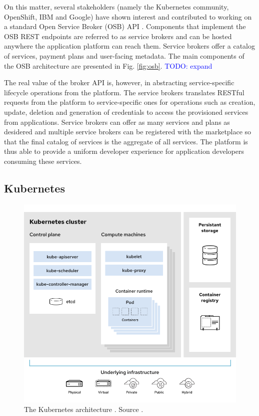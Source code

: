 On this matter, several stakeholders (namely the Kubernetes community, OpenShift, IBM and Google) have shown interest and contributed to working on a standard Open Service Broker (OSB) API \cite{osb}. Components that implement the OSB REST endpoints are referred to as service brokers and can be hosted anywhere the application platform can reach them. Service brokers offer a catalog of services, payment plans and user-facing metadata. The main components of the OSB architecture are presented in Fig. \ref{fig:osb}. \textcolor{blue}{TODO: expand}

The real value of the broker API is, however, in abstracting service-specific lifecycle operations from the platform. The service brokers translates RESTful requests from the platform to service-specific ones for operations such as creation, update, deletion and generation of credentials to access the provisioned services from applications. Service brokers can offer as many services and plans as desidered and multiple service brokers can be registered with the marketplace so that the final catalog of services is the aggregate of all services. The platform is thus able to provide a uniform developer experience for application developers consuming these services.

\subsection{Kubernetes}
\label{sec:kubernetes}

\begin{figure}[h]
\centering
\includegraphics[width=\columnwidth]{figures/kubernetes}
\caption{The Kubernetes architecture \label{fig:kubernetes}. Source \cite{k8s-architecture}.}
\end{figure}

